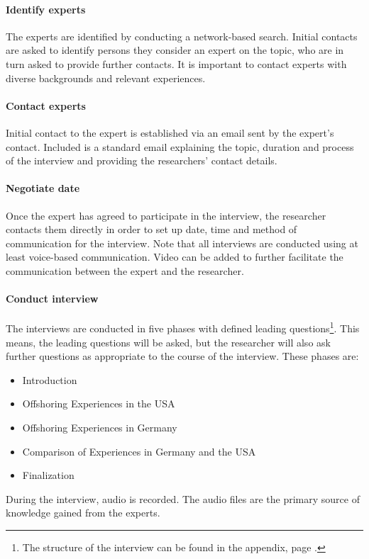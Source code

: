 \newpage

\paragraph{Identify experts} The experts are identified by conducting a network-based search. Initial contacts are asked to identify persons they consider an expert on the topic, who are in turn asked to provide further contacts. It is important to contact experts with diverse backgrounds and relevant experiences.
\paragraph{Contact experts} Initial contact to the expert is established via an email sent by the expert's contact. Included is a standard email explaining the topic, duration and process of the interview and providing the researchers' contact details.
\paragraph{Negotiate date} Once the expert has agreed to participate in the interview, the researcher contacts them directly in order to set up date, time and method of communication for the interview. Note that all interviews are conducted using at least voice-based communication. Video can be added to further facilitate the communication between the expert and the researcher.
\paragraph{Conduct interview} The interviews are conducted in five phases with defined leading questions\footnote{The structure of the interview can be found in the appendix, page \pageref{app:InterviewStructure}.}. This means, the leading questions will be asked, but the researcher will also ask further questions as appropriate to the course of the interview. These phases are:
\begin{itemize}
	\item Introduction
	\item Offshoring Experiences in the USA
	\item Offshoring Experiences in Germany
	\item Comparison of Experiences in Germany and the USA
	\item Finalization
\end{itemize}
During the interview, audio is recorded. The audio files are the primary source of knowledge gained from the experts.


